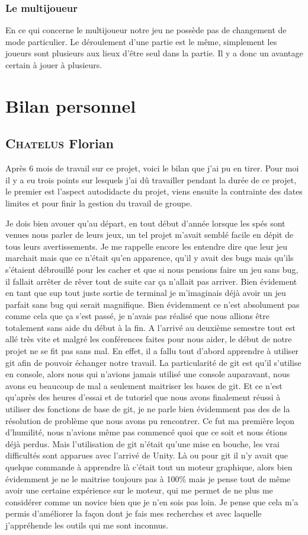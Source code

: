 \documentclass[a4paper, 12pt]{article}
\begin{document}
			\subsubsection{Le multijoueur}
			En ce qui concerne le multijoueur notre jeu ne possède pas de changement de mode particulier. Le déroulement d’une partie est le même, simplement les joueurs sont plusieurs aux lieux d’être seul dans la partie. Il y a donc un avantage certain à jouer à plusieurs.
				
			
\section{Bilan personnel}
	\subsection{\textsc{Chatelus} Florian}
	Après 6 mois de travail sur ce projet, voici le bilan que j’ai pu en tirer. Pour moi il y a eu trois points sur lesquels j’ai dû travailler pendant la durée de ce projet, le premier est l’aspect autodidacte du projet, viens ensuite la contrainte des dates limites et pour finir la gestion du travail de groupe.
		\smallbreak
\par Je dois bien avouer qu’au départ, en tout début d’année lorsque les spés sont venues nous parler de leurs jeux, un tel projet m’avait semblé facile en dépit de tous leurs avertissements. Je me rappelle encore les entendre dire que leur jeu marchait mais que ce n’était qu’en apparence, qu’il y avait des bugs mais qu’ils s’étaient débrouillé pour les cacher et que si nous pensions faire un jeu sans bug, il fallait arrêter de rêver tout de suite car ça n’allait pas arriver. Bien évidement en tant que sup tout juste sortie de terminal je m’imaginais déjà avoir un jeu parfait sans bug qui serait magnifique. Bien évidemment ce n’est absolument pas comme cela que ça s’est passé, je n’avais pas réalisé que nous allions être totalement sans aide du début à la fin. A l’arrivé au deuxième semestre tout est allé très vite et malgré les conférences faites pour nous aider, le début de notre projet ne se fit pas sans mal. En effet, il a fallu tout d’abord apprendre à utiliser git afin de pouvoir échanger notre travail. La particularité de git est qu’il s’utilise en console, alors nous qui n’avions jamais utilisé une console auparavant, nous avons eu beaucoup de mal a seulement maitriser les bases de git. Et ce n’est qu’après des heures d’essai et de tutoriel que nous avons finalement réussi à utiliser des fonctions de base de git, je ne parle bien évidemment pas des de la résolution de problème que nous avons pu rencontrer. Ce fut ma première leçon d’humilité, nous n’avions même pas commencé quoi que ce soit et nous étions déjà perdus. Mais l’utilisation de git n’était qu’une mise en bouche, les vrai difficultés sont apparues avec l’arrivé de Unity. Là ou pour git il n’y avait que quelque commande à apprendre là c’était tout un moteur graphique, alors bien évidemment je ne le maitrise toujours pas à 100\%  mais je pense tout de même avoir une certaine expérience sur le moteur, qui me permet de ne plus me considérer comme un novice bien que je n’en sois pas loin. Je pense que cela m’a permis d’améliorer la façon dont je fais mes recherches et avec laquelle j’appréhende les outils qui me sont inconnus.
\end{document}
